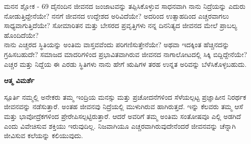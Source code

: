 \begin{mananam}{\mananamfont ಮನನ ಶ್ಲೋಕ - \textenglish{69}}
\footnotesize \mananamtext ದೈನಂದಿನ ಜೀವನದ ಜಂಜಾಟವನ್ನು ತಪ್ಪಿಸಿಕೊಳ್ಳುವ ಸಾಧನವಾಗಿ ನಾನು ನಿದ್ರೆಯನ್ನು ಎದುರು ನೋಡುತ್ತಿದ್ದೇನೆಯೇ? ನನಗೆ ಜೀವನದ ಉದ್ದೇಶದ ಅರಿವಿದೆಯೇ? ಅದರಿಂದ ಉತ್ಸಾಹದಿಂದ ಎಚ್ಚರವಾಗಲು ಸಾಧ್ಯವಾಗುತ್ತಿದೆಯೇ? ಸೋಮಾರಿತನ ಮತ್ತು ಬೇಸರದ ಪ್ರವೃತ್ತಿಗಳು ನನ್ನ ದಿನನಿತ್ಯದ ಜೀವನದ ಮೇಲೆ ಪ್ರಾಬಲ್ಯ ಹೊಂದಿದೆಯೇ?\\
 ನಾನು ಎಚ್ಚರದ ಸ್ಥಿತಿಯನ್ನು ಅಂತಿಮ ವಾಸ್ತವವೆಂದು ಪರಿಗಣಿಸುತ್ತೇನೆಯೇ? ಅಥವಾ ಇದಕ್ಕಿಂತ ಹೆಚ್ಚಿನದನ್ನು ಗ್ರಹಿಸಬಹುದೇ? ಸಮಾಜದ ಮಾದರಿಗಳಿಂದ ಪ್ರಭಾವಿತವಾಗಿರುವ ಜೀವನದ ನಾಗಾಲೋಟದಲ್ಲಿ ಸಿಕ್ಕಿ ಬಿದ್ದಿದ್ದೇನೆಯೇ? ಎಚ್ಚರ ಮತ್ತು ನಿದ್ದೆಯ ಈ ಎರಡು ಸ್ಥಿತಿಗಳು ನಾನು ಹೇಗೆ ಋಷಿಗಳ ತರಹ ಉನ್ನತ ಅರಿವನ್ನು ಬೆಳೆಸಿಕೊಳ್ಳಬಹುದು.
\end{mananam}
\WritingHand\enspace\textbf{ಆತ್ಮ ವಿಮರ್ಶೆ}
\begin{inspiration}{\mananamfont ಸ್ಪೂರ್ತಿ}
\footnotesize \mananamtext ನಮ್ಮಲ್ಲಿ ಅನೇಕರು ತಮ್ಮ ಇಂದ್ರಿಯ ಮನಸ್ಸು ಮತ್ತು ಪ್ರಚೋದನೆಗಳಿಂದ ಸೆಳೆಯಲ್ಪಟ್ಟ ಪ್ರಜ್ಞಾಹೀನ ನಿರರ್ಥಕ   ಜೀವನವನ್ನು ನಡೆಸುತ್ತಾರೆ. ಅಂತಹ ಜೀವನವು ನಿದ್ರೆಯಲ್ಲಿ  ಮುಳುಗಿರುವ ಹಾಗಿರುತ್ತದೆ. ಇನ್ನು ಕೆಲವರು ತಮ್ಮ ಆಸೆ ಮತ್ತು ಭಾವೋದ್ರೆಕಗಳಿಂದ ಪ್ರೇರೇಪಿಸಲ್ಪಟ್ಟಿರುತ್ತಾರೆ. ಆದರೆ ಅವರಿಗೆ ತಮ್ಮ ಅಂತಿಮ ಸಂತೋಷವೂ ಎಲ್ಲಿ ಅಡಗಿದೆ ಎಂದು ವಿವೇಚಿಸುವ ಶಕ್ತಿಯು ಇರುವುದಿಲ್ಲ. ನಿಜವಾಗಿಯೂ ಎಚ್ಚರವಾಗಿರುವುದೇನೆಂದರೆ ಜೀವನವನ್ನು ಚೆನ್ನಾಗಿ ಜೀವಿಸುವ ಕಲೆಯನ್ನು ಕಲಿಯುವುದು.
\end{inspiration}
\newpage


